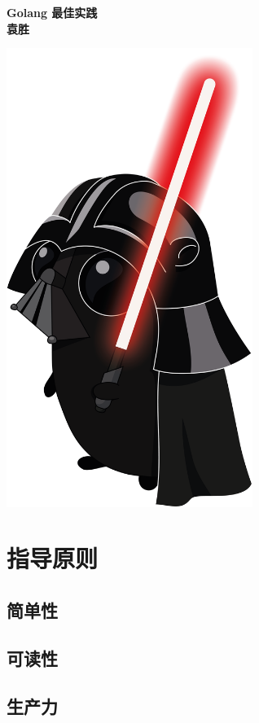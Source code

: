 \documentclass{paper}
\begin{document}
\begin{titlepage}
	\centering
	\vfill
	{\bfseries\Huge
		Golang 最佳实践\\
		\vskip1cm
		\Large
		袁胜 \\
	}
	\vfill
	
	\includegraphics[width=8cm]{gopher_dart.png} %
	\vfill
	\vfill
\end{titlepage}

\tableofcontents


\section{指导原则}

\subsection{简单性}

\subsection{可读性}

\subsection{生产力}
\end{document}
